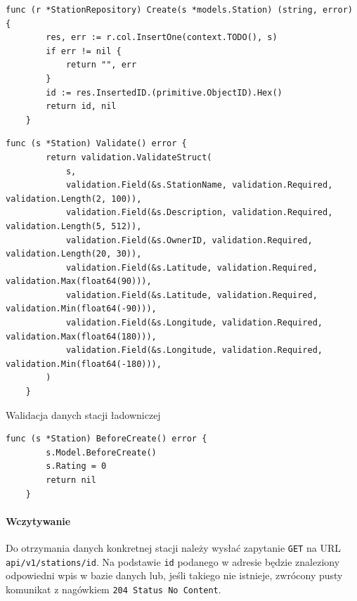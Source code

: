 \begin{lstlisting}[label=list:repo_create_station,caption=Dodanie wpisu stacji ładowniczej do bazy danych,basicstyle=\tiny\ttfamily]
    func (r *StationRepository) Create(s *models.Station) (string, error) {
        res, err := r.col.InsertOne(context.TODO(), s)
        if err != nil {
            return "", err
        }
        id := res.InsertedID.(primitive.ObjectID).Hex()
        return id, nil
    }
\end{lstlisting}

\begin{lstlisting}[label=list:before_create_station,caption=Walidacja danych stacji ładowniczej,basicstyle=\tiny\ttfamily]
    func (s *Station) Validate() error {
        return validation.ValidateStruct(
            s,
            validation.Field(&s.StationName, validation.Required, validation.Length(2, 100)),
            validation.Field(&s.Description, validation.Required, validation.Length(5, 512)),
            validation.Field(&s.OwnerID, validation.Required, validation.Length(20, 30)),
            validation.Field(&s.Latitude, validation.Required, validation.Max(float64(90))),
            validation.Field(&s.Latitude, validation.Required, validation.Min(float64(-90))),
            validation.Field(&s.Longitude, validation.Required, validation.Max(float64(180))),
            validation.Field(&s.Longitude, validation.Required, validation.Min(float64(-180))),
        )
    }
\end{lstlisting}Walidacja danych stacji ładowniczej

\begin{lstlisting}[label=list:validation_station,caption=Uzupełnienie danych systemowych dotyczących,basicstyle=\tiny\ttfamily]
    func (s *Station) BeforeCreate() error {
        s.Model.BeforeCreate()
        s.Rating = 0
        return nil
    }
\end{lstlisting}

\paragraph{Wczytywanie\newline}
Do otrzymania danych konkretnej stacji należy wysłać zapytanie \texttt{GET} na URL \texttt{api/v1/stations/{id}}. Na podstawie \texttt{id} podanego w adresie będzie znaleziony odpowiedni wpis w bazie danych lub, jeśli takiego nie istnieje, zwrócony pusty komunikat z nagówkiem \texttt{204 Status No Content}.

